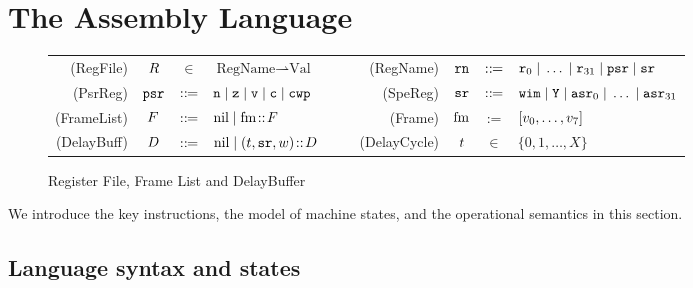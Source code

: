 \section{The \sparc{} Assembly Language}
\label{sec:modeling}

\begin{figure}[!t]
	\small
	\begin{tabular}{rcclcrccl}
		(RegFile) & $R$ & $\in$ & $\text{RegName} \rightharpoonup 
			\text{Val}$

         & $\quad$ &
        (RegName) & $\texttt{rn}$ & $::\!\!{=}$ &
         $\texttt{r}_{0} \; | \; \dots \; | \; \texttt{r}_{31} \; | \; \texttt{psr} \; | \; \texttt{sr}$ \\
		
		(PsrReg) & $\texttt{psr}$ & $::\!\!{=}$ &
		$\texttt{n} \; | \;
			\texttt{z} \; | \;
			\texttt{v} \; | \;
			\texttt{c} \; | \; \texttt{cwp}$ & $\quad$ &
		(SpeReg) & $\texttt{sr}$ & $::\!\!{=}$ &
		$\texttt{wim} \; | \;
			\texttt{Y} \; | \;
\texttt{asr}_0 \; | \; \dots \; | \; \texttt{asr}_{31}$ \\
		
		(FrameList) & $F$ & $::\!\!{=}$ &
                            $\text{nil} \; | \; \text{fm} \!::\! F$ & $\quad$ &
		(Frame) & $\text{fm}$ & := & $[v_0, \dots, v_7]$ \\
		
		(DelayBuff) & $D$ & $::\!\!{=}$ & $\text{nil} \; | \;
                                  (t, \texttt{sr}, w) \!::\! D$
                                  & $\quad$
		& (DelayCycle) & $t$ & $\in$ & $\{ 0, 1, \dots, X \}$
	\end{tabular}
	\caption{Register File, Frame List and DelayBuffer}
	\label{fig:Register File and Frame List}
\end{figure}

We introduce the key \sparc{} instructions, the model of machine
states, and the operational semantics in this section.

\subsection{Language syntax and states}
\label{subsec:syntax}
		
